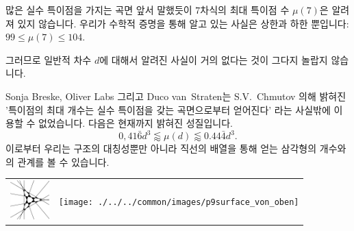 \begin{surferPage}[216개의 특이점]{많은 실수 특이점을 가지는 곡면}
    앞서 말했듯이 $7$차식의 최대 특이점 수 $\mu(7)$은 알려져 있지 않습니다. 우리가 수학적 증명을 통해 알고 있는 사실은 상한과 하한 뿐입니다:
$99\le \mu(7) \le 104$.


    그러므로 일반적 차수 $d$에 대해서 알려진 사실이 거의 없다는 것이 그다지 놀랍지 않습니다. 

    Sonja Breske, Oliver Labs 그리고 Duco van~Straten는 S.V.\ Chmutov 의해 밝혀진 '특이점의 최대 개수는 실수 특이점을 갖는 곡면으로부터 얻어진다' 라는 사실밖에 이용할 수 없었습니다. 다음은 현재까지 밝혀진 성질입니다.
    \[0,41\bar{6}d^3 \lessapprox \mu(d) \lessapprox 0.44\bar{4} d^3.\]
    이로부터 우리는 구조의 대칭성뿐만 아니라 직선의 배열을 통해 얻는 삼각형의 개수와의 관계를 볼 수 있습니다. 

    \begin{center}
      \begin{tabular}{c@{\qquad}c}
        \includegraphics[height=1.5cm]{./../../common/images/vielesing.pdf}
        &
        \texttt{[image: ./../../common/images/p9surface\_von\_oben]}
      \end{tabular}
    \end{center}
\end{surferPage}
